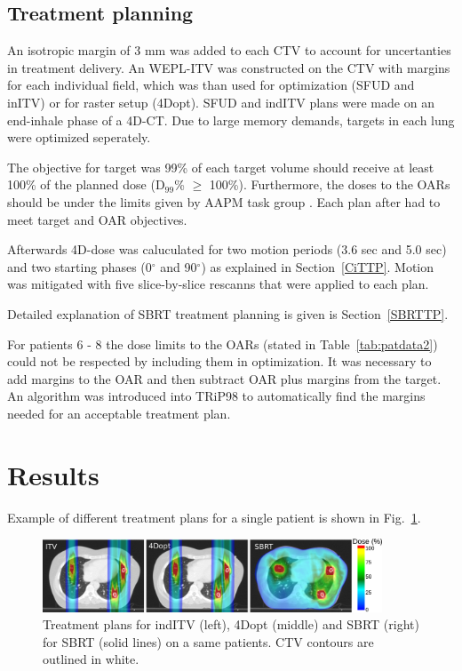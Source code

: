 \documentclass[type=dr, dr=rernat, accentcolor=tud7b,colorbacktitle, bigchapter, openright, twoside, 12pt ]{tudthesis}
\begin{document}
\subsection{Treatment planning}

An isotropic margin of 3 mm was added to each CTV to account for uncertanties in treatment delivery. An WEPL-ITV was constructed on the CTV with margins for each individual field, which was than used for optimization (SFUD
and inITV) or for raster setup (4Dopt). SFUD and indITV plans were made on an end-inhale phase of a 4D-CT. Due to large memory demands, targets in each lung were optimized seperately. 
  
The objective for target was 99\% of each target volume should receive at least 100\% of the planned dose (D$_{99}$\% $\geq$ 100\%). Furthermore, the doses to the OARs should be under the limits given by AAPM task group \cite{Benedict2010}. 
Each plan after had to meet target and OAR objectives. 

Afterwards 4D-dose was caluculated for two motion periods (3.6 sec and 5.0 sec) and two starting phases (0$^\circ$ and 90$^\circ$) as explained in Section~\ref{CiTTP}. Motion was mitigated with five 
slice-by-slice rescanns that were applied to each plan.

Detailed explanation of SBRT treatment planning is given is Section~\ref{SBRTTP}.

For patients 6 - 8 the dose limits to the OARs (stated in Table~\ref{tab:patdata2}) could not be respected by including them in optimization. It was necessary to add margins to the OAR and then 
subtract OAR plus margins from the target. An algorithm was introduced into TRiP98 to automatically find the margins needed for an acceptable treatment plan.

\section{Results}

Example of different treatment plans for a single patient is shown in Fig.~\ref{Fig:multiExample}.

\begin{figure}[H]
	\begin{center}
		\includegraphics[width=0.9\textwidth]{./Images/multiExample.png}
		\caption{Treatment plans for indITV (left), 4Dopt (middle) and SBRT (right) for SBRT (solid lines) on a same patients. CTV contours are outlined in white.}
		\label{Fig:multiExample}
	\end{center}
\end{figure}
\end{document}
